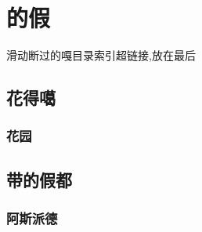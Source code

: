 \chapter{的假}
滑动断过的嘎目录索引超链接,放在最后\footnotemark[1]
\section{花得噶}
\subsection{花园}
\section{带的假都}
\subsection{阿斯派德}